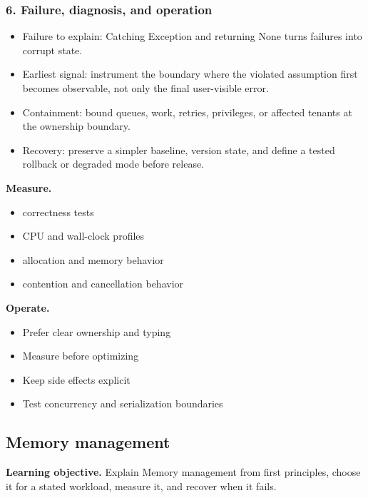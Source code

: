 \subsubsection*{6. Failure, diagnosis, and operation}
\begin{itemize}
\item Failure to explain: Catching Exception and returning None turns failures into corrupt state.
\item Earliest signal: instrument the boundary where the violated assumption first becomes observable, not only the final user-visible error.
\item Containment: bound queues, work, retries, privileges, or affected tenants at the ownership boundary.
\item Recovery: preserve a simpler baseline, version state, and define a tested rollback or degraded mode before release.
\end{itemize}
\textbf{Measure.}\begin{itemize}
\item correctness tests
\item CPU and wall-clock profiles
\item allocation and memory behavior
\item contention and cancellation behavior
\end{itemize}
\textbf{Operate.}\begin{itemize}
\item Prefer clear ownership and typing
\item Measure before optimizing
\item Keep side effects explicit
\item Test concurrency and serialization boundaries
\end{itemize}
\subsection{Memory management}
\textbf{Learning objective.} Explain Memory management from first principles, choose it for a stated workload, measure it, and recover when it fails.
